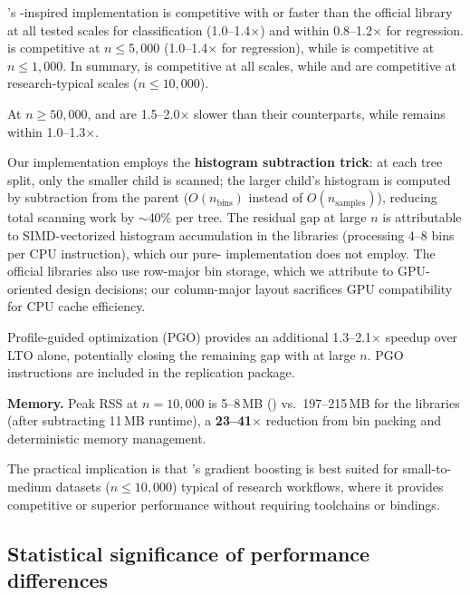 \documentclass[article]{jss}
\begin{document}
's -inspired implementation is competitive with or
faster than the official library at all tested scales for classification
(1.0--1.4$\times$) and within 0.8--1.2$\times$ for regression.
 is competitive at $n \leq 5{,}000$ (1.0--1.4$\times$ for
regression), while  is competitive at $n \leq 1{,}000$.
In summary,  is competitive at all scales, while 
and  are competitive at research-typical scales
($n \leq 10{,}000$).

At $n \geq 50{,}000$,  and  are 1.5--2.0$\times$
slower than their  counterparts, while  remains
within 1.0--1.3$\times$.

Our implementation employs the \textbf{histogram subtraction trick}: at each
tree split, only the smaller child is scanned; the larger child's histogram is
computed by subtraction from the parent ($O(n_{\text{bins}})$ instead of
$O(n_{\text{samples}})$), reducing total scanning work by $\sim$40\% per tree.
The residual gap at large $n$ is attributable to SIMD-vectorized histogram
accumulation in the  libraries (processing 4--8 bins per CPU
instruction), which our pure- implementation does not employ.
The official libraries also use row-major bin storage, which we attribute to
GPU-oriented design decisions; our column-major layout sacrifices GPU
compatibility for CPU cache efficiency.

Profile-guided optimization (PGO) provides an additional 1.3--2.1$\times$
speedup over LTO alone, potentially closing the remaining gap with
 at large $n$. PGO instructions are included in the
replication package.

\textbf{Memory.} Peak RSS at $n = 10{,}000$ is 5--8\,MB ()
vs.\ 197--215\,MB for the  libraries (after subtracting
11\,MB  runtime), a \textbf{23--41$\times$} reduction from
 bin packing and deterministic memory management.

The practical implication is that 's gradient boosting is
best suited for small-to-medium datasets ($n \leq 10{,}000$) typical of
research workflows, where it provides competitive or superior performance
without requiring  toolchains or  bindings.

\subsection{Statistical significance of performance differences}
\end{document}
